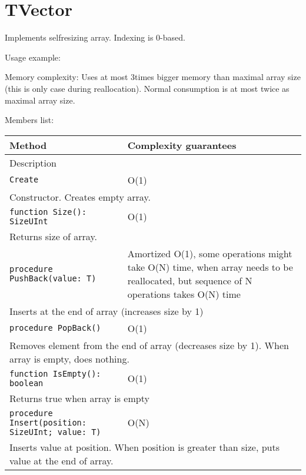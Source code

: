\chapter{TVector}

Implements selfresizing array. Indexing is 0-based.

Usage example:



Memory complexity:
Uses at most 3times bigger memory than maximal array size (this is only case during reallocation).
Normal consumption is at most twice as maximal array size.

Members list:

\begin{longtable}{|m{10cm}|m{5cm}|}
\hline
Method & Complexity guarantees \\ \hline
\multicolumn{2}{|m{15cm}|}{Description} \\ \hline\hline

\verb!Create! & O(1) \\ \hline
\multicolumn{2}{|m{15cm}|}{Constructor. Creates empty array.} \\ \hline\hline

\verb!function Size(): SizeUInt! & O(1) \\ \hline
\multicolumn{2}{|m{15cm}|}{Returns size of array.} \\\hline\hline

\verb!procedure PushBack(value: T)! &  Amortized
O(1), some operations might take O(N) time, when array needs to be reallocated, but sequence of N
operations takes O(N) time \\ \hline
\multicolumn{2}{|m{15cm}|}{Inserts at the end of array (increases size by 1)} \\\hline\hline

\verb!procedure PopBack()! & O(1) \\\hline
\multicolumn{2}{|m{15cm}|}{Removes element from the end of array (decreases size by 1). When array
is empty, does nothing.} \\\hline\hline

\verb!function IsEmpty(): boolean! & O(1) \\ \hline
\multicolumn{2}{|m{15cm}|}{Returns true when array is empty} \\\hline\hline

\verb!procedure Insert(position: SizeUInt; value: T)! & O(N) \\\hline
\multicolumn{2}{|m{15cm}|}{Inserts value at position. When position is greater than size, puts value
at the end of array.} \\\hline\hline


\end{longtable}
